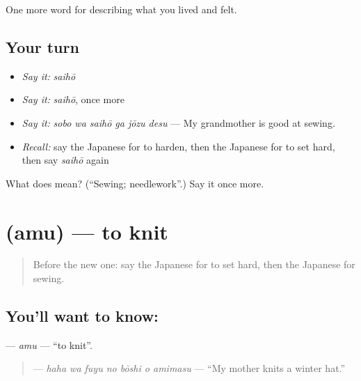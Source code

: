 \begin{grammarlens}[title={What you've built}]
One more word for describing what you lived and felt.
\end{grammarlens}

\subsection*{Your turn}
\begin{itemize}
\raggedright
  \item \emph{Say it:} \emph{saihō}
  \item \emph{Say it:} \emph{saihō}, once more
  \item \emph{Say it:} \emph{sobo wa saihō ga jōzu desu} — My grandmother is good at sewing.
  \item \emph{Recall:} say the Japanese for to harden, then the Japanese for to set hard, then say \emph{saihō} again
\end{itemize}

\begin{tcolorbox}[breakable,colback=teal!4,colframe=teal!35!black,title={Before you move on}]
What does  mean? (\textquotedblleft{}Sewing; needlework\textquotedblright{}.) Say it once more.
\end{tcolorbox}
\section[\texorpdfstring{\ja{あむ} (amu)}{あむ (amu)}]{ (amu) — to knit}

\label{lesson:JA-C484-amu}



\begin{quote}
Before the new one: say the Japanese for to set hard, then the Japanese for sewing.
\end{quote}

\subsection*{You'll want to know: }
\textbf{} — \emph{amu} — \textquotedblleft{}to knit\textquotedblright{}.

\begin{quote}
\textbf{   } — \emph{haha wa fuyu no bōshi o amimasu} — \textquotedblleft{}My mother knits a winter hat.\textquotedblright{}
\end{quote}

